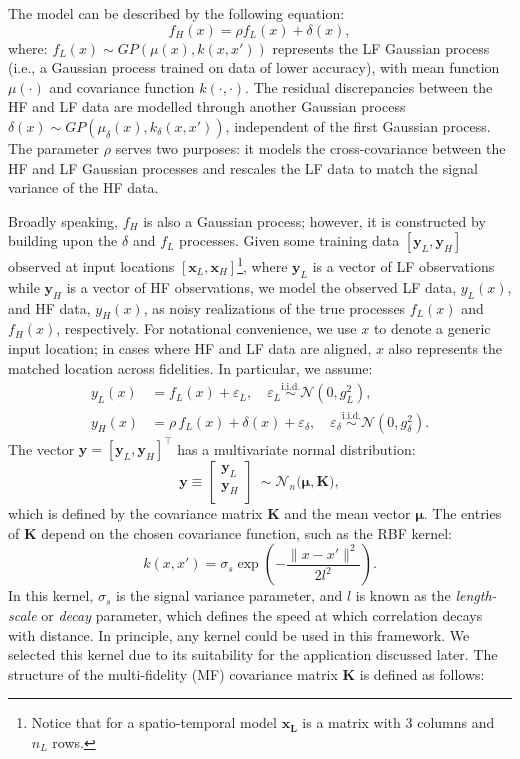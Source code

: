 \documentclass[12pt]{article}
\begin{document}
The model can be described by the following equation:
\begin{equation}
    f_H(x) = \rho f_L(x) + \delta(x),
\end{equation}
where: \( f_L(x) \sim GP(\mu(x), k(x,x')) \) represents the LF Gaussian process (i.e., a Gaussian process trained on data of lower accuracy), with mean function \( \mu(\cdot) \) and covariance function \( k(\cdot,\cdot) \). The residual discrepancies between the HF and LF data are modelled through another Gaussian process \( \delta(x) \sim GP(\mu_{\delta}(x), k_{\delta}(x,x')) \), independent of the first Gaussian process. The parameter \( \rho \) serves two purposes: it models the cross-covariance between the HF and LF Gaussian processes and rescales the LF data to match the signal variance of the HF data. 

\noindent %
\hangindent=-5mm
Broadly speaking, $f_H$ is also a Gaussian process; however, it is constructed by building upon the $\delta$ and $f_L$ processes. Given some training data \( [\bm{y}_L, \bm{y}_H] \) observed at input locations \( [\bm{x}_L, \bm{x}_H] \)\footnote{Notice that for a spatio-temporal model \( \bm{x_L} \) is a matrix with 3 columns and $n_L$ rows.}, where $\bm{y}_L$ is a vector of LF observations while $\bm{y}_H$ is a vector of HF observations, we model the observed LF data, \( y_L(x) \), and HF data, \( y_H(x) \), as noisy realizations of the true processes \( f_L(x) \) and \( f_H(x) \), respectively. For notational convenience, we use $x$ to denote a generic input location; in cases where HF and LF data are aligned, 
$x$ also represents the matched location across fidelities. In particular, we assume:
\begin{align}
    y_L(x) &= f_L(x) + \varepsilon_L, \quad \varepsilon_L \overset{\text{i.i.d.}} \sim \mathcal{N}(0, g^2_L), \\
    y_H(x)&= \rho\, f_L(x) + \delta(x) + \varepsilon_{\delta}, \quad \varepsilon_{\delta} \overset{\text{i.i.d.}} \sim \mathcal{N}(0, g^2_{\delta}).
\end{align}
The vector $\bm{y}=[\bm{y}_L, \bm{y}_H]^\top$ has a multivariate normal distribution:
\begin{equation}
    \bm{y}\equiv\begin{bmatrix}
        \bm{y}_L\\ \bm{y}_H \\ 
    \end{bmatrix}~\sim \mathcal{N}_n\big(\bm{\mu}, \bm{K} \big),
\end{equation}
which is defined by the covariance matrix $\bm{K}$ and the mean vector $\bm{\mu}$. The entries of $\bm{K}$ depend on the chosen covariance function, such as the RBF kernel:
\[
k(x,x') = \sigma_s\exp\left(-\frac{\|x - x'\|^2}{2 l^2}\right).
\]
In this kernel, $\sigma_s$ is the signal variance parameter, and $l$ is known as the \textit{length-scale} or \textit{decay} parameter, which defines the speed at which correlation decays with distance.
In principle, any kernel could be used in this framework. We selected this kernel due to its suitability for the application discussed later. 
The structure of the multi-fidelity (MF) covariance matrix $\bm{K}$ is defined as follows:
\end{document}
